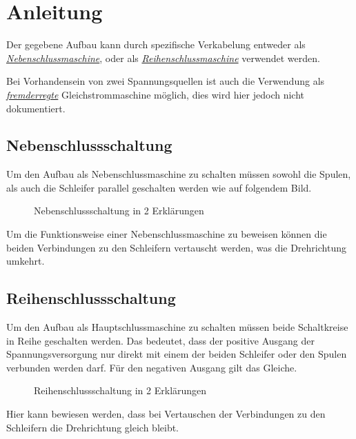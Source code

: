\section{Anleitung}

Der gegebene Aufbau kann durch spezifische Verkabelung entweder als \hyperref[neben]{\textit{Nebenschlussmaschine}}, oder als \hyperref[reihen]{\textit{Reihenschlussmaschine}} verwendet werden.

Bei Vorhandensein von zwei Spannungsquellen ist auch die Verwendung als \hyperref[fremd]{\textit{fremderregte}} Gleichstrommaschine möglich, dies wird hier jedoch nicht dokumentiert.

\subsection{Nebenschlussschaltung}

Um den Aufbau als Nebenschlussmaschine zu schalten müssen sowohl die Spulen, als auch die Schleifer parallel geschalten werden wie auf folgendem Bild.

\begin{figure}[H]
    \centering
    \hfill
    \hfill
    \hfill
    \caption{Nebenschlussschaltung in 2 Erklärungen}
\end{figure}

Um die Funktionsweise einer Nebenschlussmaschine zu beweisen können die beiden Verbindungen zu den Schleifern vertauscht werden, was die Drehrichtung umkehrt.

\subsection{Reihenschlussschaltung}

Um den Aufbau als Hauptschlussmaschine zu schalten müssen beide Schaltkreise in Reihe geschalten werden.
Das bedeutet, dass der positive Ausgang der Spannungsversorgung nur direkt mit einem der beiden Schleifer oder den Spulen verbunden werden darf.
Für den negativen Ausgang gilt das Gleiche.

\begin{figure}[H]
    \centering
    \hfill
    \hfill
    \hfill
    \caption{Reihenschlussschaltung in 2 Erklärungen}
\end{figure}

Hier kann bewiesen werden, dass bei Vertauschen der Verbindungen zu den Schleifern die Drehrichtung gleich bleibt.